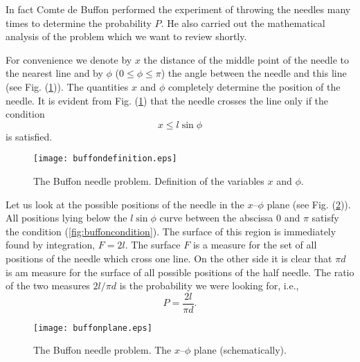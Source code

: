 In fact Comte de Buffon performed the experiment of throwing the
needles many times to determine the probability $P$. He also carried
out the mathematical analysis of the problem which we want to review
shortly.

For convenience we denote by $x$ the distance of the middle point of
the needle to the nearest line and by $\phi$ ($0 \le \phi \le \pi$) the
angle between the needle and this line (see
Fig. (\ref{fig:buffondefinition})). The quantities $x$ and $\phi$
completely determine the position of the needle. It is evident from
Fig. (\ref{fig:buffondefinition}) that the needle crosses the line only if
the condition
\begin{equation}
\label{fig:buffoncondition}
x \le l \sin \phi
\end{equation}
is satisfied.

\begin{figure}
\label{fig:buffondefinition}
\texttt{[image: buffondefinition.eps]}
\caption{The Buffon needle problem. Definition of the variables $x$
  and $\phi$.}
\end{figure}

Let us look at the possible positions of the needle in the $x$--$\phi$
plane (see Fig. (\ref{fig:buffonplane})). All positions lying below the
$l\sin \phi$ curve between the abscissa 0 and $\pi$ satisfy the
condition (\ref{fig:buffoncondition}). The surface of this region is
immediately found by integration, $F=2l$. The surface $F$ is a measure
for the set of all positions of the needle which cross one line. On
the other side it is clear that $\pi d$ is am measure for the surface
of all possible positions of the half needle. The ratio of the two
measures $ 2l/\pi d$ is the probability we were looking for, i.e.,
\begin{equation}
\label{buffonprobability}
P = \frac{2 l}{\pi d}.
\end{equation}

\begin{figure}
\label{fig:buffonplane}
\texttt{[image: buffonplane.eps]}
\caption{The Buffon needle problem. The $x$--$\phi$ plane (schematically).}
\end{figure}

